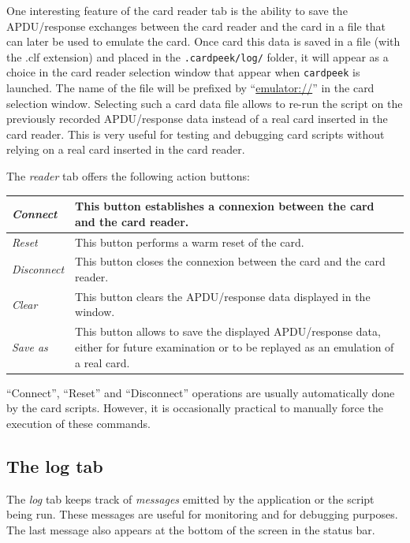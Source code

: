 \documentclass[11pt]{report}
\newcommand{\syn}[1]{\texttt{#1}}
\begin{document}
One interesting feature of the card reader tab is the ability to save the APDU/response exchanges between the card reader and
the card in a file that can later be used to emulate the card. Once card this data is saved in a file (with the .clf
extension) and placed in the \syn{.cardpeek/log/} folder, it will appear as a choice in the card reader selection
window that appear when \texttt{cardpeek} is launched. The name of the file will be prefixed by 
``\url{emulator://}'' in the card selection window. Selecting such a card data file allows to re-run the script
on the previously recorded APDU/response data instead of a real card inserted in the card reader. This is very useful for
testing and debugging card scripts without relying on a real card inserted in the card reader.

The \emph{reader} tab offers the following action buttons:

\vspace{1em}\noindent
\begin{tabular}{l|p{12cm}}
\hline
\emph{Connect}    & This button establishes a connexion between the card and the card reader. \\  
\hline
\emph{Reset}      & This button performs a warm reset of the card.\\
\hline
\emph{Disconnect} & This button closes the connexion between the card and the card reader.\\
\hline
\emph{Clear}      & This button clears the APDU/response data displayed in the window. \\
\hline
\emph{Save as}     & This button allows to save the displayed APDU/response data, either for future examination or
		     to be replayed as an emulation of a real card. \\
\hline
\end{tabular}
\vspace{2em}

``Connect'', ``Reset'' and ``Disconnect'' operations are usually automatically done by the card scripts.
However, it is occasionally practical to manually force the execution of these commands.

\subsection{The log tab}

The \emph{log} tab keeps track of \emph{messages} emitted by the application or the script being run.
These messages are useful for monitoring and for debugging purposes. 
The last message also appears at the bottom of the screen in the status bar.
\end{document}
